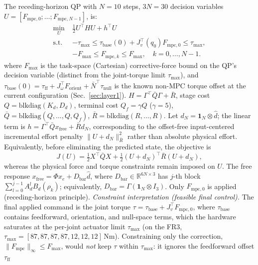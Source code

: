 \documentclass[journal]{IEEEtran}
\newcommand{\Fmpc}{F_{\text{mpc}}}
\newcommand{\Fmpck}[1]{F_{\text{mpc},#1}}
\newcommand{\dhat}{\hat{d}}
\begin{document}
The receding-horizon QP with $N=10$ steps, $3N=30$ decision variables
$U=[\Fmpck{0};\ldots;\Fmpck{N-1}]$, is:
\begin{subequations}\label{eq:QP}
\begin{align}
  \min_U\;& \tfrac{1}{2}U^\top HU+h^\top U \label{eq:QP_cost}\\
  \text{s.t.}\;&
  -\tau_{\max}\leq
  \tau_{\text{base}}(0)+J_v^\top(q_0)\Fmpck{0}
  \leq\tau_{\max}, \label{eq:QP_torque}\\
  & -F_{\max}\leq\Fmpck{k}\leq F_{\max},
  \quad k=0,\ldots,N-1. \label{eq:QP_force}
\end{align}
\end{subequations}
where $F_{\max}$ is the task-space (Cartesian) corrective-force bound on the
QP's decision variable (distinct from the joint-torque limit $\tau_{\max}$),
and $\tau_{\text{base}}(0)=\tau_{\text{ff}}+J_\omega^\top F_{\text{orient}}+\bar{N}^\top\tau_{\text{null}}$
is the known non-MPC torque offset at the current configuration
(Sec.~\ref{sec:layer1}). $H=\Gamma^\top\bar{Q}\Gamma+\bar{R}$, stage cost
$Q=\text{blkdiag}(K_d,D_d)$, terminal cost $Q_f=\gamma Q$ ($\gamma=5$),
$\bar{Q}=\text{blkdiag}(Q,\ldots,Q,Q_f)$,
$\bar{R}=\text{blkdiag}(R,\ldots,R)$.
Let $d_N=\mathbf 1_N\otimes\dhat$; the linear term is
$h=\Gamma^\top\bar{Q}x_{\text{free}}+\bar R d_N$, corresponding to the
offset-free input-centered incremental effort penalty
$\|U+d_N\|_{\bar R}^2$ rather than absolute physical effort.
Equivalently, before eliminating the predicted state, the objective is
\begin{equation}\label{eq:centeredcost}
 J(U)=\tfrac12X^\top\bar QX
 +\tfrac12(U+d_N)^\top\bar R(U+d_N),
\end{equation}
whereas the physical force and torque constraints remain imposed on $U$.
The free response $x_{\text{free}}=\Phi x_e+D_{\text{bar}}\dhat$,
where $D_{\text{bar}}\in\mathbb{R}^{6N\times3}$ has $j$-th block
$\sum_{l=0}^{j-1}A_d^l B_d(\rho_k)$; equivalently,
$D_{\text{bar}}=\Gamma(\mathbf 1_N\otimes I_3)$.
Only $\Fmpck{0}$ is applied (receding-horizon principle).
\emph{Constraint interpretation (feasible final control).} The final
applied command is the joint torque
$\tau=\tau_{\text{base}}+J_v^\top\Fmpck{0}$, where
$\tau_{\text{base}}$ contains feedforward, orientation, and null-space terms,
which the hardware saturates at the per-joint actuator limit $\tau_{\max}$
(on the FR3, $\tau_{\max}=[87,87,87,87,12,12,12]$\,Nm). Constraining only the
correction, $\|\Fmpc\|_\infty\leq F_{\max}$, would \emph{not} keep $\tau$
within $\tau_{\max}$: it ignores the feedforward offset $\tau_{\text{ff}}$
\end{document}
